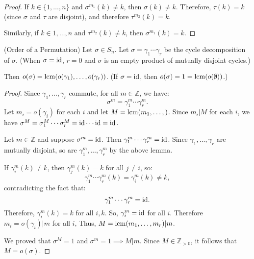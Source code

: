 \begin{itemize}
\begin{proof}
        If $k\in\{1,\dots,n\}$ and $\sigma^{m_1}(k)\neq k$, then $\sigma(k)\neq k$. Therefore, $\tau(k)=k$ (since $\sigma$ and $\tau$ are disjoint), and therefore $\tau^{m_2}(k)=k$.

        Similarly, if $k \in {1,\dots,n}$ and $\tau^{m_2}(k) \neq k$, then $\sigma^{m_1}(k)=k$.
    \end{proof}
    \begin{theorem}
        (Order of a Permutation) Let $\sigma \in S_n$. Let $\sigma = \gamma_1 \cdots \gamma_r$ be the cycle decomposition of $\sigma$. (When $\sigma=\text{id}$, $r=0$ and $\sigma$ is an empty product of mutually disjoint cycles.)
        \vspace{2mm}

        Then $o(\sigma) = \operatorname{lcm}(o(\gamma_1),\dots,o(\gamma_r))$. (If $\sigma=\text{id}$, then $o(\sigma)=1=\operatorname{lcm}(o(\emptyset))$.)
    \end{theorem}
    \begin{proof}
        Since $\gamma_1,\dots,\gamma_r$ commute, for all $m\in \mathbb{Z}$, we have:
        \begin{equation}
            \sigma^m = \gamma_1^m \cdots \gamma_r^m.
        \end{equation}
        Let $m_i= o(\gamma_i)$ for each $i$ and let $M=\operatorname{lcm}(m_1,\dots,)$. Since $m_i | M$ for each $i$, we have $\sigma^M = \sigma_1^M \cdots \sigma_r^M = \text{id} \cdots \text{id} = \text{id}$.

        Let $m\in \mathbb{Z}$ and suppose $\sigma^m=\text{id}$. Then $\gamma_1^m \cdots \gamma_r^m=\text{id}$. Since $\gamma_1,\dots,\gamma_r$ are mutually disjoint, so are $\gamma_1^{m},\dots,\gamma_r^{m}$ by the above lemma.

        If $\gamma_i^m(k) \neq k$, then $\gamma_j^m(k)=k$ for all $j\neq i$, so:
        \begin{equation}
            \gamma_1^m\cdots \gamma_r^m(k) = \gamma_i^m(k) \neq k,
        \end{equation}
        contradicting the fact that:
        \begin{equation}
            \gamma_1^m \cdots \gamma_r^m = \text{id}.
        \end{equation}
        Therefore, $\gamma_i^m(k)=k$ for all $i,k$. So, $\gamma_i^m=\text{id}$ for all $i$. Therefore $m_i=o(\gamma_i) | m$ for all $i$, Thus, $M=\operatorname{lcm}(m_1,\dots,m_r) | m$.

        We proved that $\sigma^M=1$ and $\sigma^m=1 \implies M|m$. Since $M \in \mathbb{Z}_{>0}$, it follows that $M=o(\sigma)$.
    \end{proof}
\end{itemize}